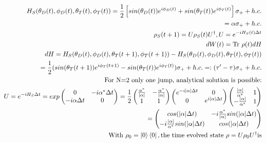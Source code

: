 \documentclass{article}
\begin{document}
	\begin{align*}
		H_S(\theta_D(t), \phi_D(t), \theta_T(t), \phi_T(t)) = \frac{1}{2} \left[sin(\theta_D(t)) e^{i\phi_D(t)} + sin(\theta_T(t)) e^{i\phi_T(t)}\right] \sigma_{+} + h.c. \\
		= \alpha \sigma_{+} + h.c. \\
		\rho_S(t+1) = U \rho_S(t) U^\dagger, U = e^{-iH_S(t) \Delta t} \\
		dW(t) = \textrm{Tr} \ \rho(t) dH \\
		dH = H_S(\theta_D(t), \phi_D(t), \theta_T(t+1), \phi_T(t+1)) - H_S(\theta_D(t), \phi_D(t), \theta_T(t), \phi_T(t)) \\
		= \frac{1}{2}(sin(\theta_T(t+1))e^{i\phi_T(t+1)} - sin(\theta_T(t))e^{i\phi_T(t)}) \sigma_{+} + h.c. =: (\tau' - \tau) \sigma_{+} + h.c. \\
		\textrm{For N=2 only one jump, analytical solution is possible:} \\
		U = e^{-iH_S \Delta t} = 
		exp \begin{pmatrix}
		0 & -i\alpha^* \Delta t \\
		-i \alpha \Delta t & 0 \\
		\end{pmatrix} = 
		\frac{1}{2} \begin{pmatrix}
		\frac{\alpha^*}{\abs{\alpha}} & -\frac{\alpha^*}{\abs{\alpha}} \\
		1 & 1 \\
		\end{pmatrix}
		\begin{pmatrix}
		e^{-i\abs{\alpha} \Delta t} & 0 \\
		0 & e^{i\abs{\alpha} \Delta t} \\
		\end{pmatrix}
		\begin{pmatrix}
		\frac{\abs{\alpha}}{\alpha^*} & 1 \\
		-\frac{\abs{\alpha}}{\alpha^*} & 1 \\
		\end{pmatrix} \\
		= \begin{pmatrix}
		cos(\abs{\alpha}\Delta t) & -i\frac{\alpha^*}{\abs{\alpha}} sin(\abs{\alpha}\Delta t) \\
		-i\frac{\abs{\alpha}}{\alpha^*} sin(\abs{\alpha}\Delta t) & cos(\abs{\alpha} \Delta t) \\
		\end{pmatrix} \\
		\mathrm{With} \ \rho_0 = \ket{0}\bra{0}, \mathrm{the \ time \ evolved \ state} \ \rho = U \rho_0 U^\dagger \mathrm{is} \\

\end{align*}
\end{document}
